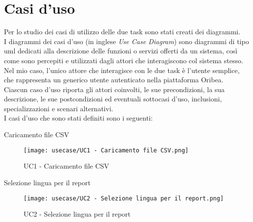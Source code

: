 \newpage

\section{Casi d'uso}

Per lo studio dei casi di utilizzo delle due task sono stati creati dei diagrammi.\\
I diagrammi dei casi d'uso (in inglese \emph{Use Case Diagram}) sono diagrammi di tipo \gls{uml} dedicati alla descrizione delle funzioni o servizi offerti da un sistema, così come sono percepiti e utilizzati dagli attori che interagiscono col sistema stesso. Nel mio caso, l'unico attore che interagisce con le due task è l'utente semplice, che rappresenta un generico utente autenticato nella piattaforma Oribea.\\
Ciascun caso d’uso riporta gli attori coinvolti, le sue precondizioni, la sua descrizione, le sue postcondizioni ed eventuali sottocasi d’uso, inclusioni, specializzazioni e
scenari alternativi.\\
I casi d’uso che sono stati definiti sono i seguenti:


\hypertarget{UC1}{}
\begin{usecase}{1}{Caricamento file CSV}

\begin{figure}[!h] 
    \centering 
    \texttt{[image: usecase/UC1 - Caricamento file CSV.png]}
    \caption{UC1 - Caricamento file CSV}
\end{figure}

\label{uc:caricamento-file-csv}
\end{usecase}


\hypertarget{UC2}{}
\begin{usecase}{2}{Selezione lingua per il report}

\begin{figure}[!h] 
    \centering 
    \texttt{[image: usecase/UC2 - Selezione lingua per il report.png]}
    \caption{UC2 - Selezione lingua per il report}
\end{figure}

\label{uc:selezione-lingua-report}
\end{usecase}


